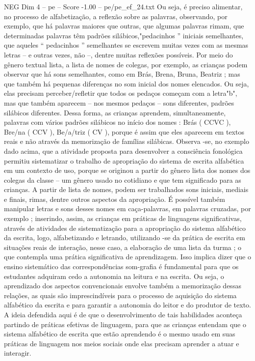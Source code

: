 \begin{textsample}{NEG Dim 4 – pe – Score -1.00 – pe/pe\_ef\_24.txt}
Ou seja, é preciso alimentar, no processo de alfabetização, a reflexão sobre as palavras, observando, por exemplo, que há palavras maiores que outras, que algumas palavras rimam, que determinadas palavras têm padrões silábicos,"pedacinhos ” iniciais semelhantes, que aqueles “ pedacinhos ” semelhantes se escrevem muitas vezes com as mesmas letras – e outras vezes, não –, dentre muitas reflexões possíveis.
Por meio do gênero textual lista, a lista de nomes de colegas, por exemplo, as crianças podem observar que há sons semelhantes, como em Brás, Brena, Bruna, Beatriz ; mas que também há pequenas diferenças no som inicial dos nomes elencados.
Ou seja, elas precisam perceber/refletir que todos os pedaços começam com a letra"b", mas que também aparecem – nos mesmos pedaços – sons diferentes, padrões silábicos diferentes.
Dessa forma, as crianças aprendem, simultaneamente, palavras com vários padrões silábicos no início dos nomes : Brás ( CCVC ), Bre/na ( CCV ), Be/a/triz ( CV ), porque é assim que eles aparecem em textos reais e não através da memorização de famílias silábicas.
Observa -se, no exemplo dado acima, que a atividade proposta para desenvolver a consciência fonológica permitiu sistematizar o trabalho de apropriação do sistema de escrita alfabética em um contexto de uso, porque se originou a partir do gênero lista dos nomes dos colegas da classe – um gênero usado no cotidiano e que tem significado para as crianças.
A partir de lista de nomes, podem ser trabalhados sons iniciais, mediais e finais, rimas, dentre outros aspectos da apropriação.
É possível também manipular letras e sons desses nomes em caça-palavras, em palavras cruzadas, por exemplo ; inserindo, assim, as crianças em práticas de linguagens significativas, através de atividades de sistematização para a apropriação do sistema alfabético da escrita, logo, alfabetizando e letrando, utilizando -se da prática de escrita em situações reais de interação, nesse caso, a elaboração de uma lista da turma ; o que contempla uma prática significativa de aprendizagem.
Isso implica dizer que o ensino sistemático das correspondências som-grafia é fundamental para que os estudantes adquiram cedo a autonomia na leitura e na escrita.
Ou seja, o aprendizado dos aspectos convencionais envolve também a memorização dessas relações, as quais são imprescindíveis para o processo de aquisição do sistema alfabético da escrita e para garantir a autonomia do leitor e do produtor de texto.
A ideia defendida aqui é de que o desenvolvimento de tais habilidades aconteça partindo de práticas efetivas de linguagem, para que as crianças entendam que o sistema alfabético de escrita que estão aprendendo é o mesmo usado em suas práticas de linguagem nos meios sociais onde elas precisam aprender a atuar e interagir.

\end{textsample}
